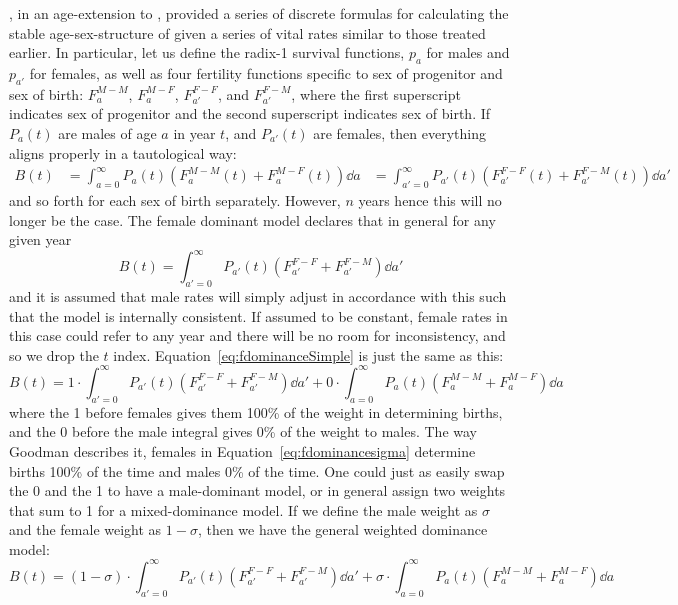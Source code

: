 \FloatBarrier
\label{sec:googmanage}
\citet{goodman1967age}, in an age-extension to \citet{goodman1953population},
provided a series of discrete formulas for calculating the
stable age-sex-structure of given a series of vital rates similar to those
treated earlier. In particular, let us define the radix-1 survival functions,
$p_a$ for males and $p_{a'}$ for females, as well as four fertility
functions specific to sex of progenitor and sex of birth:
$F_a^{M-M}$, $F_a^{M-F}$, $F_{a'}^{F-F}$, and  $F_{a'}^{F-M}$, where the first
superscript indicates sex of progenitor and the second superscript indicates sex
of birth. If $P_a(t)$ are males of age $a$ in year $t$, and $P_{a'}(t)$ are
females, then everything aligns properly in a tautological way:
\begin{align}
B(t) &= \int_{a=0}^\infty P_a(t) (F_a^{M-M}(t)+F_a^{M-F}(t)) \dd a
     &= \int_{a'=0}^\infty P_{a'}(t) (F_{a'}^{F-F}(t)+F_{a'}^{F-M}(t)) \dd a'
\end{align}
and so forth for each sex of birth separately. However, $n$ years hence this
will no longer be the case. The female dominant model declares that in general
for any given year
\begin{equation}
\label{eq:fdominanceSimple}
B(t) = \int_{a'=0}^\infty P_{a'}(t) (F_{a'}^{F-F}+F_{a'}^{F-M}) \dd a'
\end{equation}
and it is assumed that male rates will simply adjust in accordance with this
such that the model is internally consistent. If assumed  to be constant, female
rates in this case could refer to any year and there will be no room for
inconsistency, and so we drop the $t$ index.
Equation~\eqref{eq:fdominanceSimple} is just the same as this:
\begin{equation}
\label{eq:fdominancesigma}
B(t) = 1 \cdot \int_{a'=0}^\infty P_{a'}(t) (F_{a'}^{F-F}+F_{a'}^{F-M}) \dd a' +
       0 \cdot \int_{a=0}^\infty P_a(t) (F_a^{M-M}+F_a^{M-F}) \dd a
\end{equation}
where the 1 before females gives them 100\% of the weight in determining births,
and the 0 before the male integral gives 0\% of the weight to males. The way
Goodman describes it, females in Equation~\ref{eq:fdominancesigma} determine
births 100\% of the time and males 0\% of the time. One could just as easily
swap the 0 and the 1 to have a male-dominant model, or in general assign two
weights that sum to 1 for a mixed-dominance model. If we define the male weight
as $\sigma$ and the female weight as $1-\sigma$, then we have the general
weighted dominance model:
\begin{equation}
\label{eq:dominancesigma}
B(t) = (1-\sigma) \cdot \int_{a'=0}^\infty P_{a'}(t) (F_{a'}^{F-F}+F_{a'}^{F-M})
\dd a' + \sigma \cdot \int_{a=0}^\infty P_a(t) (F_a^{M-M}+F_a^{M-F}) \dd a
\end{equation}
